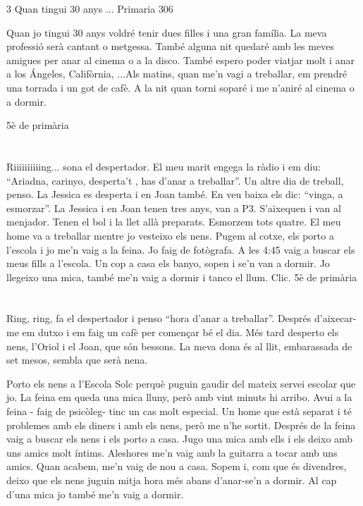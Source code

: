 \begin{news}
{3} %
{Quan tingui 30 anys ...}
{}
{Primaria}
{306}

Quan jo tingui 30 anys voldré tenir dues filles i una gran família. La meva professió serà cantant o metgessa. També alguna nit quedaré amb les meves amigues per anar al cinema o a la disco. També espero poder viatjar molt  i anar a los Ángeles, Califòrnia, ...Als matins, quan me’n vagi a treballar,  em prendré una torrada i un got de cafè. A la nit quan torni soparé i me n’aniré al cinema o a dormir.

							{5è de primària}

\section*{}
Riiiiiiiiiing... sona el despertador. El meu marit engega la ràdio i em diu: “Ariadna, carinyo, desperta’t ,  has d’anar a treballar”. Un altre dia de treball, penso. La Jessica es desperta i en Joan també. En veu baixa els dic: “vinga, a esmorzar”. La Jessica i en Joan tenen tres anys, van a P3. S’aixequen i van al menjador. Tenen el bol i la llet allà preparats. Esmorzem tots quatre. El meu home va a treballar mentre jo vesteixo els nens. Pugem al cotxe, els porto a l’escola i jo me’n vaig a la feina. Jo faig de fotògrafa. A les 4:45 vaig a buscar els  meus fills a l’escola. Un cop a casa els banyo, sopen i se’n van a dormir. Jo llegeixo una mica, també me’n vaig a dormir i tanco el llum. Clic.
							 {5è de primària}

\section*{}
Ring, ring, fa el despertador i penso “hora d’anar a treballar”. Després d’aixecar-me em dutxo i em faig un cafè per començar bé el dia. Més tard desperto els nens, l’Oriol i el Joan, que són bessons. La meva dona és al llit, embarassada de set mesos, sembla que serà nena.

Porto els nens a l’Escola Solc perquè puguin gaudir del mateix servei escolar que jo. La feina em queda una mica lluny, però amb vint minuts hi arribo. Avui a la feina - faig de psicòleg-  tinc un cas molt especial. Un home que està separat i té problemes amb els diners i amb els nens, però me n’he sortit. Després de la feina vaig a buscar els nens i els porto a casa. Jugo una mica amb ells i els deixo amb uns amics molt íntims. Aleshores me’n vaig amb la guitarra  a tocar amb uns amics. Quan acabem, me’n vaig de nou a casa. Sopem i,  com que és divendres,  deixo que els nens juguin mitja hora més abans d’anar-se’n a dormir. Al cap d’una mica jo també me’n vaig a dormir.


\end{news}
